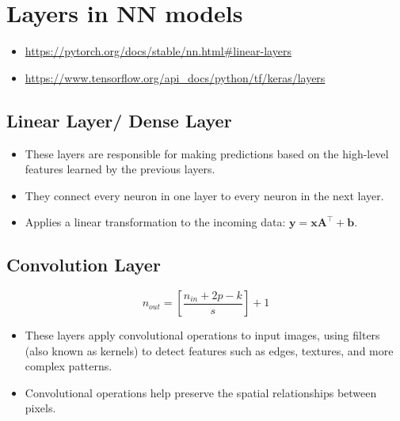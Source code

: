 \chapter{Layers in NN models}

\begin{itemize}
    \item \url{https://pytorch.org/docs/stable/nn.html#linear-layers}
    \item \url{https://www.tensorflow.org/api_docs/python/tf/keras/layers}
\end{itemize}


\section{Linear Layer/ Dense Layer \cite{pytorch-Linear,gfg-convolutional-neural-network-cnn-in-machine-learning}}\label{nn: Linear Layer/ Dense Layer}

\begin{itemize}
    \item These layers are responsible for making predictions based on the high-level features learned by the previous layers. 
    
    \item They connect every neuron in one layer to every neuron in the next layer.
    
    \item Applies a linear transformation to the incoming data: $\mathbf{y=xA^\top+b}$.
\end{itemize}




\section{Convolution Layer \cite{gfg-convolutional-neural-network-cnn-in-machine-learning}}\label{nn: Convolution Layer}

\[
   \displaystyle n_{out} = \left[ \frac{n_{in} + 2p - k}{s} \right] + 1
\]

\begin{itemize}
    \item These layers apply convolutional operations to input images, using filters (also known as kernels) to detect features such as edges, textures, and more complex patterns. 
    
    \item Convolutional operations help preserve the spatial relationships between pixels.
\end{itemize}

